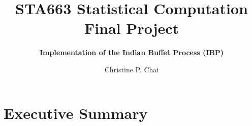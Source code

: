 \documentclass[12pt]{article}
\begin{document}
\vspace{-1in}
\title{\bf STA663 Statistical Computation Final Project}
\author{\bf Implementation of the Indian Buffet Process (IBP)}
\date{Christine P. Chai}
\maketitle 
\vspace{-0.5in}

\section*{Executive Summary}










\end{document}
